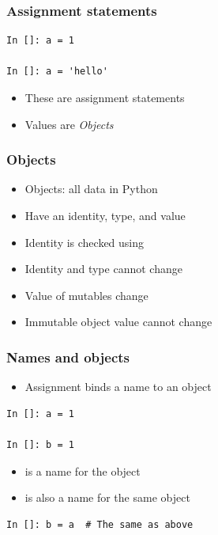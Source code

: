 \documentclass[14pt,compress]{beamer}
\begin{document}
\begin{frame}[fragile]
  \frametitle{Assignment statements}
  \begin{lstlisting}
In []: a = 1

In []: a = 'hello'
\end{lstlisting}
\begin{itemize}
\item These are assignment statements
\item Values are \emph{Objects}
\end{itemize}
\end{frame}

\begin{frame}
  \frametitle{Objects}
  \begin{itemize}
  \item Objects: all data in Python
  \item Have an identity, type, and value
  \item Identity is checked using 
  \item Identity and type cannot change
  \item Value of mutables change
  \item Immutable object value cannot change
  \end{itemize}
\end{frame}

\begin{frame}[fragile]
  \frametitle{Names and objects}
  \begin{itemize}
  \item Assignment binds a name to an object
  \end{itemize}
  \begin{lstlisting}
In []: a = 1

In []: b = 1
  \end{lstlisting}
  \begin{itemize}
  \item {} is a name for the object 
  \item {} is also a name for the same object 
  \end{itemize}
  \begin{lstlisting}
In []: b = a  # The same as above
\end{lstlisting}
\end{frame}
\end{document}
